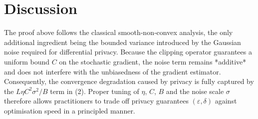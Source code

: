 \documentclass{article}
\begin{document}
\section*{Discussion}
The proof above follows the classical smooth‑non‑convex analysis, the only
additional ingredient being the bounded variance introduced by the Gaussian
noise required for differential privacy.  Because the clipping operator guarantees
a uniform bound $C$ on the stochastic gradient, the noise term remains
*additive* and does not interfere with the unbiasedness of the gradient estimator.
Consequently, the convergence degradation caused by privacy is fully captured
by the $L\eta C^{2}\sigma^{2}/B$ term in (2).  Proper tuning of $\eta$, $C$, $B$
and the noise scale $\sigma$ therefore allows practitioners to trade off
privacy guarantees $(\varepsilon,\delta)$ against optimisation speed in a
principled manner.
\end{document}
